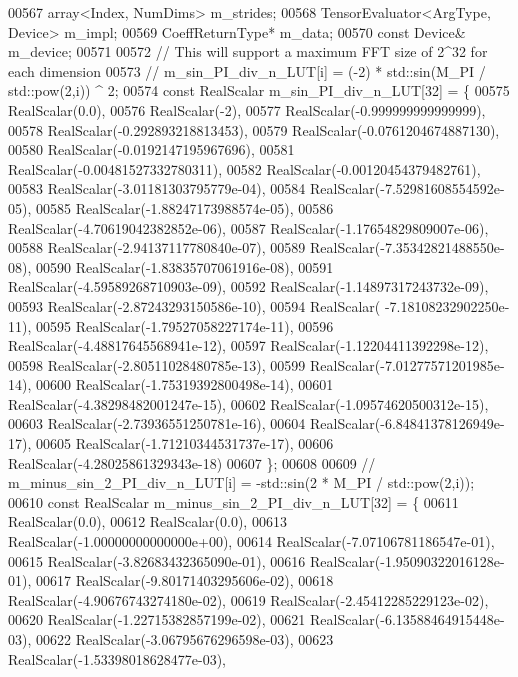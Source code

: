 \begin{DoxyCode}
00567   array<Index, NumDims> m\_strides;
00568   TensorEvaluator<ArgType, Device> m\_impl;
00569   CoeffReturnType* m\_data;
00570   \textcolor{keyword}{const} Device& m\_device;
00571 
00572   \textcolor{comment}{// This will support a maximum FFT size of 2^32 for each dimension}
00573   \textcolor{comment}{// m\_sin\_PI\_div\_n\_LUT[i] = (-2) * std::sin(M\_PI / std::pow(2,i)) ^ 2;}
00574   \textcolor{keyword}{const} RealScalar m\_sin\_PI\_div\_n\_LUT[32] = \{
00575     RealScalar(0.0),
00576     RealScalar(-2),
00577     RealScalar(-0.999999999999999),
00578     RealScalar(-0.292893218813453),
00579     RealScalar(-0.0761204674887130),
00580     RealScalar(-0.0192147195967696),
00581     RealScalar(-0.00481527332780311),
00582     RealScalar(-0.00120454379482761),
00583     RealScalar(-3.01181303795779e-04),
00584     RealScalar(-7.52981608554592e-05),
00585     RealScalar(-1.88247173988574e-05),
00586     RealScalar(-4.70619042382852e-06),
00587     RealScalar(-1.17654829809007e-06),
00588     RealScalar(-2.94137117780840e-07),
00589     RealScalar(-7.35342821488550e-08),
00590     RealScalar(-1.83835707061916e-08),
00591     RealScalar(-4.59589268710903e-09),
00592     RealScalar(-1.14897317243732e-09),
00593     RealScalar(-2.87243293150586e-10),
00594     RealScalar( -7.18108232902250e-11),
00595     RealScalar(-1.79527058227174e-11),
00596     RealScalar(-4.48817645568941e-12),
00597     RealScalar(-1.12204411392298e-12),
00598     RealScalar(-2.80511028480785e-13),
00599     RealScalar(-7.01277571201985e-14),
00600     RealScalar(-1.75319392800498e-14),
00601     RealScalar(-4.38298482001247e-15),
00602     RealScalar(-1.09574620500312e-15),
00603     RealScalar(-2.73936551250781e-16),
00604     RealScalar(-6.84841378126949e-17),
00605     RealScalar(-1.71210344531737e-17),
00606     RealScalar(-4.28025861329343e-18)
00607   \};
00608 
00609   \textcolor{comment}{// m\_minus\_sin\_2\_PI\_div\_n\_LUT[i] = -std::sin(2 * M\_PI / std::pow(2,i));}
00610   \textcolor{keyword}{const} RealScalar m\_minus\_sin\_2\_PI\_div\_n\_LUT[32] = \{
00611     RealScalar(0.0),
00612     RealScalar(0.0),
00613     RealScalar(-1.00000000000000e+00),
00614     RealScalar(-7.07106781186547e-01),
00615     RealScalar(-3.82683432365090e-01),
00616     RealScalar(-1.95090322016128e-01),
00617     RealScalar(-9.80171403295606e-02),
00618     RealScalar(-4.90676743274180e-02),
00619     RealScalar(-2.45412285229123e-02),
00620     RealScalar(-1.22715382857199e-02),
00621     RealScalar(-6.13588464915448e-03),
00622     RealScalar(-3.06795676296598e-03),
00623     RealScalar(-1.53398018628477e-03),

\end{DoxyCode}
